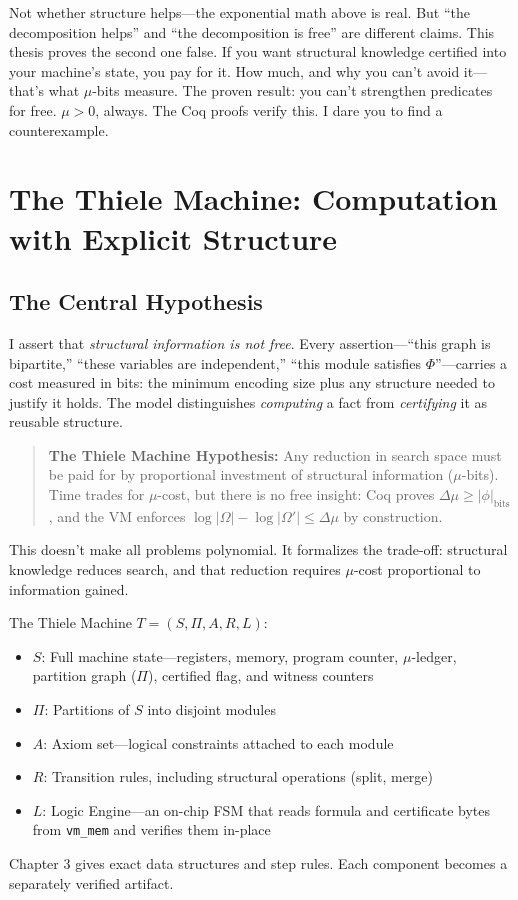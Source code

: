 Not whether structure helps---the exponential math above is real. But ``the decomposition helps'' and ``the decomposition is free'' are different claims. This thesis proves the second one false. If you want structural knowledge certified into your machine's state, you pay for it. How much, and why you can't avoid it---that's what $\mu$-bits measure. The proven result: you can't strengthen predicates for free. $\mu > 0$, always. The Coq proofs verify this. I dare you to find a counterexample.


\section{The Thiele Machine: Computation with Explicit Structure}

\subsection{The Central Hypothesis}

I assert that \textit{structural information is not free}. Every assertion---``this graph is bipartite,'' ``these variables are independent,'' ``this module satisfies $\Phi$''---carries a cost measured in bits: the minimum encoding size plus any structure needed to justify it holds. The model distinguishes \emph{computing} a fact from \emph{certifying} it as reusable structure.

\begin{quote}
    \textbf{The Thiele Machine Hypothesis:} Any reduction in search space must be paid for by proportional investment of structural information ($\mu$-bits). Time trades for $\mu$-cost, but there is no free insight: Coq proves $\Delta\mu \ge |\phi|_{\text{bits}}$, and the VM enforces $\log|\Omega| - \log|\Omega'| \le \Delta\mu$ by construction.
\end{quote}

This doesn't make all problems polynomial. It formalizes the trade-off: structural knowledge reduces search, and that reduction requires $\mu$-cost proportional to information gained.

The Thiele Machine $T = (S, \Pi, A, R, L)$:
\begin{itemize}
    \item $S$: Full machine state---registers, memory, program counter, $\mu$-ledger, partition graph ($\Pi$), certified flag, and witness counters
    \item $\Pi$: Partitions of $S$ into disjoint modules
    \item $A$: Axiom set---logical constraints attached to each module
    \item $R$: Transition rules, including structural operations (split, merge)
    \item $L$: Logic Engine---an on-chip FSM that reads formula and certificate bytes from \texttt{vm\_mem} and verifies them in-place
\end{itemize}
Chapter 3 gives exact data structures and step rules. Each component becomes a separately verified artifact.


